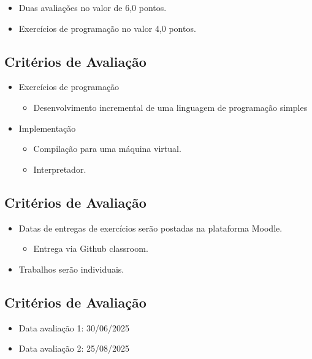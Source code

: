 \documentclass[11pt]{article}
\begin{document}
\begin{itemize}
\item Duas avaliações no valor de 6,0 pontos.

\item Exercícios de programação no valor 4,0 pontos.
\end{itemize}
\subsection*{Critérios de Avaliação}
\label{sec:orge04f4aa}

\begin{itemize}
\item Exercícios de programação
\begin{itemize}
\item Desenvolvimento incremental de uma linguagem de programação simples
\end{itemize}
\item Implementação
\begin{itemize}
\item Compilação para uma máquina virtual.
\item Interpretador.
\end{itemize}
\end{itemize}
\subsection*{Critérios de Avaliação}
\label{sec:orgdd941cb}

\begin{itemize}
\item Datas de entregas de exercícios serão postadas na plataforma Moodle.
\begin{itemize}
\item Entrega via Github classroom.
\end{itemize}

\item Trabalhos serão individuais.
\end{itemize}
\subsection*{Critérios de Avaliação}
\label{sec:orgc6146c9}

\begin{itemize}
\item Data avaliação 1: 30/06/2025
\item Data avaliação 2: 25/08/2025
\end{itemize}
\end{document}
